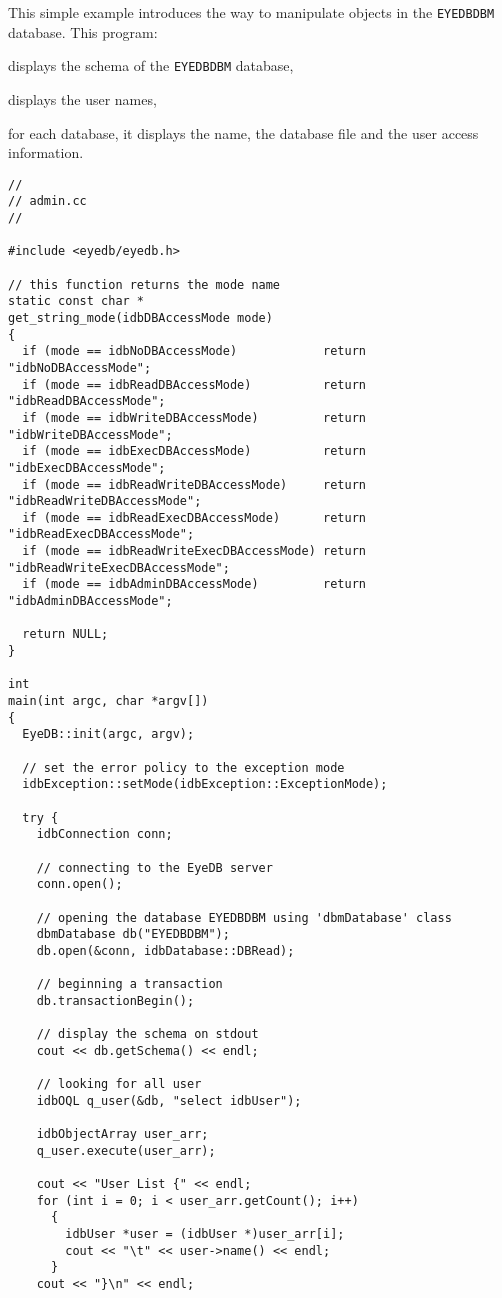 This simple example introduces the way to manipulate objects in the
\texttt{EYEDBDBM} database. This program:
\be
\item displays the schema of the \texttt{EYEDBDBM} database,
\item displays the \eyedb user names,
\item for each database, it displays the name, the database file and
the user access information.
\ee
\verbsize
\begin{verbatim}
//
// admin.cc
//

#include <eyedb/eyedb.h>

// this function returns the mode name
static const char *
get_string_mode(idbDBAccessMode mode)
{
  if (mode == idbNoDBAccessMode)            return "idbNoDBAccessMode";
  if (mode == idbReadDBAccessMode)          return "idbReadDBAccessMode";
  if (mode == idbWriteDBAccessMode)         return "idbWriteDBAccessMode";
  if (mode == idbExecDBAccessMode)          return "idbExecDBAccessMode";
  if (mode == idbReadWriteDBAccessMode)     return "idbReadWriteDBAccessMode";
  if (mode == idbReadExecDBAccessMode)      return "idbReadExecDBAccessMode";
  if (mode == idbReadWriteExecDBAccessMode) return "idbReadWriteExecDBAccessMode";
  if (mode == idbAdminDBAccessMode)         return "idbAdminDBAccessMode";

  return NULL;
}

int
main(int argc, char *argv[])
{
  EyeDB::init(argc, argv);

  // set the error policy to the exception mode
  idbException::setMode(idbException::ExceptionMode);

  try {
    idbConnection conn;

    // connecting to the EyeDB server
    conn.open();

    // opening the database EYEDBDBM using 'dbmDatabase' class
    dbmDatabase db("EYEDBDBM");
    db.open(&conn, idbDatabase::DBRead);

    // beginning a transaction
    db.transactionBegin();

    // display the schema on stdout
    cout << db.getSchema() << endl;

    // looking for all user
    idbOQL q_user(&db, "select idbUser");

    idbObjectArray user_arr;
    q_user.execute(user_arr);

    cout << "User List {" << endl;
    for (int i = 0; i < user_arr.getCount(); i++)
      {
        idbUser *user = (idbUser *)user_arr[i];
        cout << "\t" << user->name() << endl;
      }
    cout << "}\n" << endl;


\end{verbatim}
